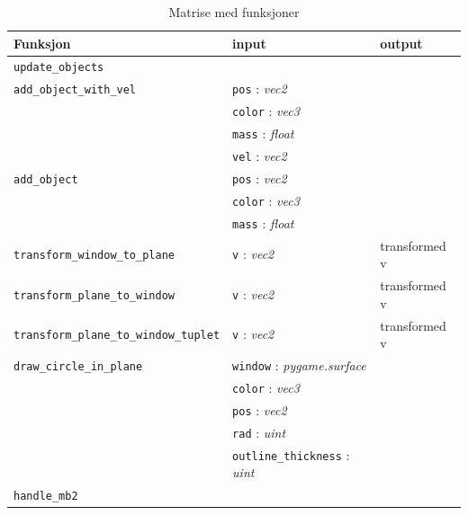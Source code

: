 \documentclass{article}
\numberwithin{equation}{section}
\begin{document}
\begin{table}[h]
  \centering
  \begin{tabular}{|l|l|l|}
  \hline
  \textbf{Funksjon} & \textbf{input} &\textbf{output} \\
  \hline
  \texttt{update\_objects} &  & \\
  \hline
    \texttt{add\_object\_with\_vel} &\texttt{pos} : \textit{vec2}&\\& \texttt{color} : \textit{vec3}&\\& \texttt{mass} : \textit{float}&\\& \texttt{vel} : \textit{vec2} & \\
  \hline
    \texttt{add\_object} &\texttt{pos} : \textit{vec2}&\\& \texttt{color} : \textit{vec3}&\\& \texttt{mass} : \textit{float}& \\
  \hline
  \texttt{transform\_window\_to\_plane} &\texttt{v} : \textit{vec2} & transformed v \\
  \hline
  \texttt{transform\_plane\_to\_window} &\texttt{v} : \textit{vec2} &transformed v \\
  \hline
    \texttt{transform\_plane\_to\_window\_tuplet} &\texttt{v} : \textit{vec2}  & transformed v\\
  \hline
    \texttt{draw\_circle\_in\_plane} &\texttt{window} : \textit{pygame.surface}&\\& \texttt{color} : \textit{vec3}&\\& \texttt{pos} : \textit{vec2}&\\& \texttt{rad} : \textit{uint}&\\& \texttt{outline\_thickness} : \textit{uint} & \\
  \hline
  \texttt{handle\_mb2} & & \\
  \hline
\end{tabular}
  \caption{Matrise med funksjoner}
\end{table}
\clearpage
\end{document}

